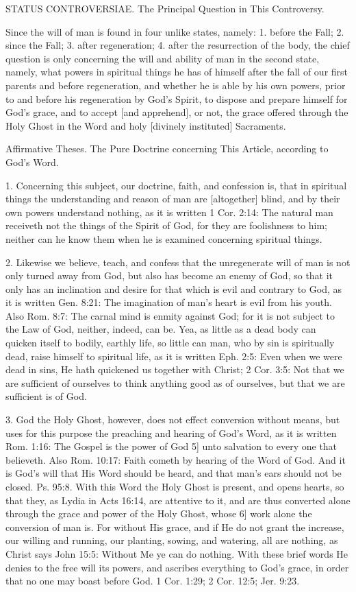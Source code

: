 STATUS CONTROVERSIAE.
The Principal Question in This Controversy.

Since the will of man is found in four unlike states, namely: 1. before the Fall; 2. since the Fall; 3. after regeneration; 4. after the resurrection of the body, the chief question is only concerning the will and ability of man in the second state, namely, what powers in spiritual things he has of himself after the fall of our first parents and before regeneration, and whether he is able by his own powers, prior to and before his regeneration by God's Spirit, to dispose and prepare himself for God's grace, and to accept [and apprehend], or not, the grace offered through the Holy Ghost in the Word and holy [divinely instituted] Sacraments.

Affirmative Theses.
The Pure Doctrine concerning This Article, according to God's Word.

1. Concerning this subject, our doctrine, faith, and confession is, that in spiritual things the understanding and reason of man are [altogether] blind, and by their own powers understand nothing, as it is written 1 Cor. 2:14: The natural man receiveth not the things of the Spirit of God, for they are foolishness to him; neither can he know them when he is examined concerning spiritual things.

2. Likewise we believe, teach, and confess that the unregenerate will of man is not only turned away from God, but also has become an enemy of God, so that it only has an inclination and desire for that which is evil and contrary to God, as it is written Gen. 8:21: The imagination of man's heart is evil from his youth. Also Rom. 8:7: The carnal mind is enmity against God; for it is not subject to the Law of God, neither, indeed, can be. Yea, as little as a dead body can quicken itself to bodily, earthly life, so little can man, who by sin is spiritually dead, raise himself to spiritual life, as it is written Eph. 2:5: Even when we were dead in sins, He hath quickened us together with Christ; 2 Cor. 3:5: Not that we are sufficient of ourselves to think anything good as of ourselves, but that we are sufficient is of God.

3. God the Holy Ghost, however, does not effect conversion without means, but uses for this purpose the preaching and hearing of God's Word, as it is written Rom. 1:16: The Gospel is the power of God 5] unto salvation to every one that believeth. Also Rom. 10:17: Faith cometh by hearing of the Word of God. And it is God's will that His Word should be heard, and that man's ears should not be closed. Ps. 95:8. With this Word the Holy Ghost is present, and opens hearts, so that they, as Lydia in Acts 16:14, are attentive to it, and are thus converted alone through the grace and power of the Holy Ghost, whose 6] work alone the conversion of man is. For without His grace, and if He do not grant the increase, our willing and running, our planting, sowing, and watering, all are nothing, as Christ says John 15:5: Without Me ye can do nothing. With these brief words He denies to the free will its powers, and ascribes everything to God's grace, in order that no one may boast before God. 1 Cor. 1:29; 2 Cor. 12:5; Jer. 9:23.

